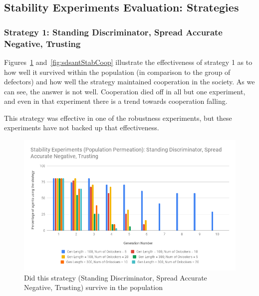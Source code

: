 \documentclass[]{final_report}
\begin{document}
\subsection{Stability Experiments Evaluation: Strategies}
\label{appendix:stab_strat_experiments}
\subsubsection{Strategy 1: Standing Discriminator, Spread Accurate Negative, Trusting}
Figures~\ref{fig:sdsantStabPop} and~\ref{fig:sdsantStabCoop} illustrate the effectiveness of strategy 1 as to how well it survived within the population (in comparison to the group of defectors) and how well the strategy maintained cooperation in the society. As we can see, the answer is not well. Cooperation died off in all but one experiment, and even in that experiment there is a trend towards cooperation falling.\par 
This strategy was effective in one of the robustness experiments, but these experiments have not backed up that effectiveness. 
\begin{figure}
\begin{framed}
	\includegraphics[width=\textwidth]{sdsantStabPop.png}
	\caption{Did this strategy (Standing Discriminator, Spread Accurate Negative, Trusting) survive in the population}
	\label{fig:sdsantStabPop}
\end{framed}
\end{figure}
\end{document}
